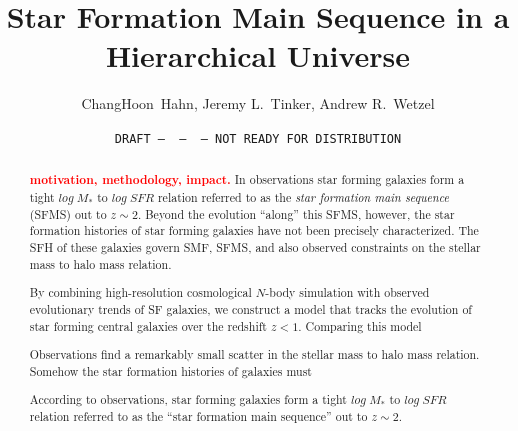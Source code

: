 \documentclass[12pt, letterpaper, preprint]{aastex}
\newcommand{\todo}[1]{{\bf \textcolor{red}{#1}}}
\begin{document}
\sloppy\sloppypar\frenchspacing

\title{Star Formation Main Sequence in a Hierarchical Universe} 
\date{\texttt{DRAFT~---~\githash~---~\gitdate~---~NOT READY FOR DISTRIBUTION}}
\author{ChangHoon~Hahn, 
Jeremy L.~Tinker, 
Andrew R.~Wetzel}

\begin{abstract}
    \todo{motivation, methodology, impact.}
    In observations star forming galaxies form a tight $log\;M_*$ to $log\;SFR$ 
    relation referred to as the {\em star formation main sequence} (SFMS) out to $z\sim2$. 
    Beyond the evolution ``along'' this SFMS, however, the star formation histories of star 
    forming galaxies have not been precisely characterized. 
    The SFH of these galaxies govern SMF, SFMS, and also observed constraints on the stellar mass to halo mass
    relation. 

    By combining high-resolution cosmological $N$-body simulation with observed evolutionary 
    trends of SF galaxies, we construct a model that tracks the evolution of star forming 
    central galaxies over the redshift $z < 1$. Comparing this model 

    Observations find a remarkably small scatter in the stellar mass to halo mass relation. 
    Somehow the star formation histories of galaxies must 
    
    According to observations, star forming galaxies form a tight $log\;M_*$ to $log\;SFR$ 
    relation referred to as the ``star formation main sequence'' out to $z\sim2$. 
\end{abstract}
\end{document}
